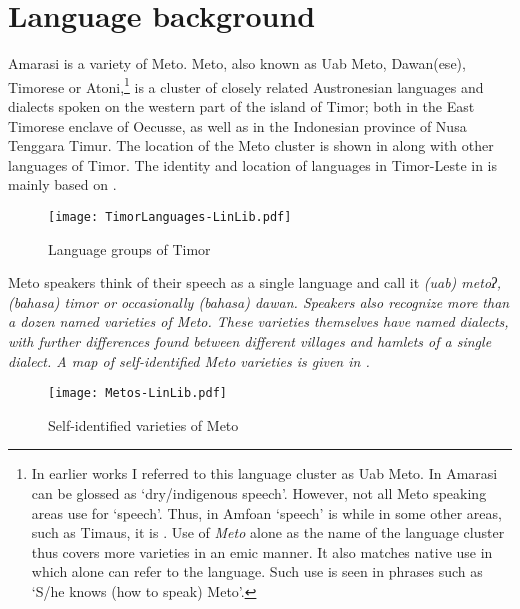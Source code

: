 \section{Language background}\label{sec:LanBac}
Amarasi is a variety of Meto.
Meto, also known as Uab Meto, Dawan(ese), Timorese or Atoni,\footnote{
		In earlier works I referred to this language cluster as Uab Meto.
		In Amarasi  can be glossed as `dry/indigenous speech'.
		However, not all Meto speaking areas use  for `speech'.
		Thus, in Amfo{\Q}an `speech' is  while
		in some other areas, such as Timaus, it is .
		Use of \emph{Meto} alone as the name of the language cluster
		thus covers more varieties in an emic manner.
		It also matches native use in which  alone
		can refer to the language.
		Such use is seen in phrases such as
		 `S/he knows (how to speak) Meto'.}
is a cluster of closely related Austronesian languages
and dialects spoken on the western part of the island of Timor;
both in the East Timorese enclave of Oecusse,
as well as in the Indonesian province of Nusa Tenggara Timur.
The location of the Meto cluster is shown in 
along with other languages of Timor.
The identity and location of languages in Timor-Leste
in  is mainly based on \cite{wiklwi15}.

\begin{figure}[h]
	\caption{Language groups of Timor}\label{fig:LanGroTim}
	\texttt{[image: TimorLanguages-LinLib.pdf]}
\end{figure}

Meto speakers think of their speech as a single language
and call it \it{(uab) metoʔ}, \it{(bahasa) timor}
or occasionally \it{(bahasa) dawan}.
Speakers also recognize more than a dozen named varieties of Meto.
These varieties themselves have named dialects,
with further differences found between different villages and hamlets of a single dialect.
A map of self-identified Meto varieties is given in .

\begin{figure}[ht]
	\caption{Self-identified varieties of Meto}\label{fig:SelIdeVarUabMeto}
	\texttt{[image: Metos-LinLib.pdf]}
\end{figure}

